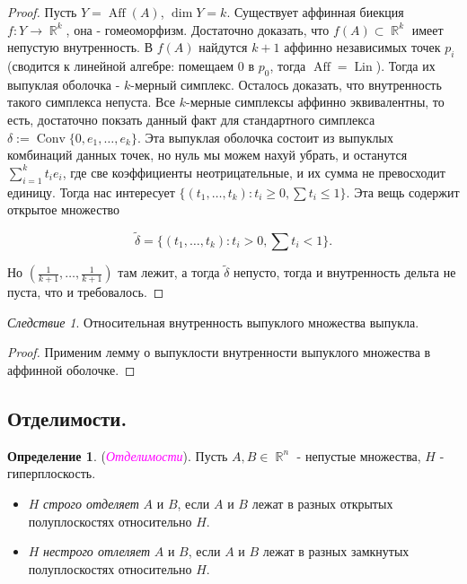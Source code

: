 \documentclass[a4paper,100pt]{article}
\theoremstyle{indented}
\theoremstyle{definition}
\newtheorem{defn}{Определение}
\theoremstyle{remark}
\newtheorem{cons}{Следствие}
\DeclareMathOperator{\ra}{\rightarrow}
\DeclareMathOperator{\Conv}{Conv}
\DeclareMathOperator{\RR}{\mathbb{R}}
\DeclareMathOperator{\Aff}{Aff}
\DeclareMathOperator{\Lin}{Lin}
\begin{document}
\begin{proof}
    Пусть $Y = \Aff (A)$, $\dim Y = k$. Существует аффинная биекция $f: Y \ra \RR^k$, она - гомеоморфизм. Достаточно доказать, что $f(A) \subset \RR^k$ имеет непустую внутренность. В $f(A)$ найдутся $k+1$ аффинно независимых точек $p_i$ (сводится к линейной алгебре: помещаем 0 в $p_0$, тогда $\Aff = \Lin$). Тогда их выпуклая оболочка - $k$-мерный симплекс. Осталось доказать, что внутренность такого симплекса непуста. Все $k$-мерные симплексы аффинно эквивалентны, то есть, достаточно покзать данный факт для стандартного симплекса $\delta := \Conv \{0, e_1, \ldots, e_k\}$. Эта выпуклая оболочка состоит из выпуклых комбинаций данных точек, но нуль мы можем нахуй убрать, и останутся $\sum_{i=1}^k t_i e_i$, где све коэффициенты неотрицательные, и их сумма не превосходит единицу. Тогда нас интересует $\{(t_1, \ldots, t_k): t_i \geq 0, \sum t_i \leq 1\}$. Эта вещь содержит открытое множество 

    \[
        \tilde{\delta} = \{(t_1, \ldots, t_k): t_i > 0, \sum t_i < 1\}. 
    \]

    Но $(\frac{1}{k+1}, \ldots, \frac{1}{k+1})$ там лежит, а тогда $\tilde{\delta}$ непусто, тогда и внутренность дельта не пуста, что и требовалось.
\end{proof}

\begin{cons}
    Относительная внутренность выпуклого множества выпукла.
\end{cons}

\begin{proof}
    Применим лемму о выпуклости внутренности выпуклого множества в аффинной оболочке.
\end{proof}

\subsection{Отделимости.}

\begin{defn}
    (\textit{\textcolor{magenta}{\hypertarget{s98}{Отделимости}}}). Пусть $A, B \in \RR^n$ - непустые множества, $H$ - гиперплоскость. 

    \begin{itemize}
        \item $H$ \textit{строго отделяет} $A$ и $B$, если $A$ и $B$ лежат в разных открытых полуплоскостях относительно $H$. 
        \item $H$ \textit{нестрого отлеляет} $A$ и $B$, если $A$ и $B$ лежат в разных замкнутых полуплоскостях относительно $H$. 
    \end{itemize}
\end{defn}
\end{document}
